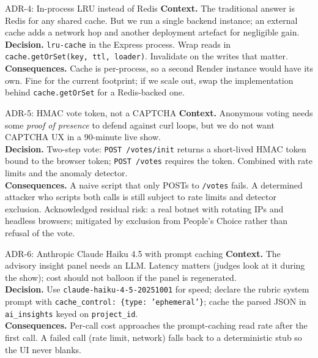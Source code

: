 \begin{ncbox}{ADR-4: In-process LRU instead of Redis}
\textbf{Context.} The traditional answer is Redis for any shared cache.
But we run a single backend instance; an external cache adds a network
hop and another deployment artefact for negligible gain.\\
\textbf{Decision.} \texttt{lru-cache} in the Express process. Wrap reads in
\texttt{cache.getOrSet(key, ttl, loader)}. Invalidate on the writes that
matter.\\
\textbf{Consequences.} Cache is per-process, so a second Render instance
would have its own. Fine for the current footprint; if we scale out, swap
the implementation behind \texttt{cache.getOrSet} for a Redis-backed one.
\end{ncbox}

\begin{ncbox}{ADR-5: HMAC vote token, not a CAPTCHA}
\textbf{Context.} Anonymous voting needs some \emph{proof of presence} to
defend against curl loops, but we do not want CAPTCHA UX in a 90-minute
live show.\\
\textbf{Decision.} Two-step vote: \texttt{POST /votes/init} returns a
short-lived HMAC token bound to the browser token; \texttt{POST /votes}
requires the token. Combined with rate limits and the anomaly detector.\\
\textbf{Consequences.} A naive script that only POSTs to \texttt{/votes}
fails. A determined attacker who scripts both calls is still subject to
rate limits and detector exclusion. Acknowledged residual risk: a real
botnet with rotating IPs and headless browsers; mitigated by exclusion
from People's Choice rather than refusal of the vote.
\end{ncbox}

\begin{ncbox}{ADR-6: Anthropic Claude Haiku 4.5 with prompt caching}
\textbf{Context.} The advisory insight panel needs an LLM. Latency
matters (judges look at it during the show); cost should not balloon if
the panel is regenerated.\\
\textbf{Decision.} Use \texttt{claude-haiku-4-5-20251001} for speed; declare
the rubric system prompt with \texttt{cache\_control: \{type: 'ephemeral'\}};
cache the parsed JSON in \texttt{ai\_insights} keyed on \texttt{project\_id}.\\
\textbf{Consequences.} Per-call cost approaches the prompt-caching read
rate after the first call. A failed call (rate limit, network) falls back
to a deterministic stub so the UI never blanks.
\end{ncbox}

